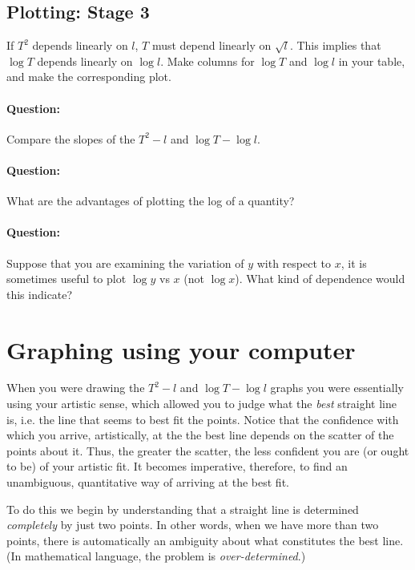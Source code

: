 \subsection{Plotting: Stage 3}

If $T^2$ depends linearly on $l$, $T$ must depend linearly on $\sqrt{l}$. This implies that $\log T$ depends linearly on $\log l$. Make columns for $\log T$ and $\log l$ in your table, and make the corresponding plot. 

\begin{question}
\paragraph{Question:} Compare the slopes of the $T^2 - l$ and $\log T - \log l$. ~\\

\paragraph{Question:} What are the advantages of plotting the log of a quantity?~\\

\paragraph{Question:} Suppose that you are examining the variation of $y$ with respect to $x$, it is sometimes useful to plot $\log y$ vs $x$ (not $\log x$). What kind of dependence would this indicate?

\end{question}

\section{Graphing using your computer}

When you were drawing the $T^2 - l$ and $\log T - \log l$ graphs you were essentially using your artistic sense, which allowed you to judge what the \textit{best} straight line is, i.e. the line that seems to best fit the points. Notice that the confidence with which you arrive, artistically, at the the best line depends on the scatter of the points about it. Thus, the greater the scatter, the less confident you are (or ought to be) of your artistic fit. It becomes imperative, therefore, to find an unambiguous, quantitative way of arriving at the best fit. 

To do this we begin by understanding that a straight line is determined \textit{completely} by just two points. In other words, when we have more than two points, there is automatically an ambiguity about what constitutes the best line. (In mathematical language, the problem is \textit{over-determined}.) 

